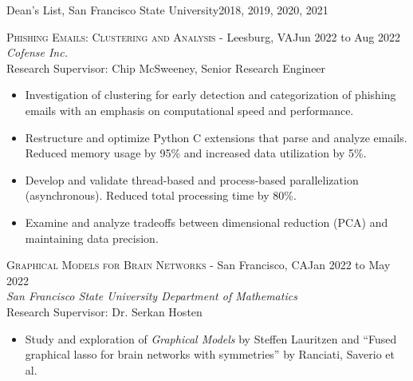 \documentclass[hidelinks, 10pt]{article}
\begin{document}
{{\begin{minipage}[ct]{0.9\linewidth}
Dean's List, San Francisco State University\hfill 2018, 2019, 2020, 2021
\end{minipage}
    
\vspace{6mm}

\hrulefill

\vspace{5mm}

\begin{minipage}[ct]{0.9\linewidth}
{\textsc{Phishing Emails: Clustering and Analysis} - Leesburg, VA}\hfill Jun 2022 to Aug 2022\\
\emph{Cofense Inc.}\\
Research Supervisor: Chip McSweeney, Senior Research Engineer
	\makeatletter
	\let\orig@listi\@listi
	\def\@listi{\orig@listi\topsep=0.25\baselineskip}
	\makeatother
    \begin{itemize}
    	\setlength\itemsep{-0.25em}
    	\item Investigation of clustering for early detection and
    	categorization of phishing emails with an emphasis on computational speed and
    	performance.
		\item Restructure and optimize Python C extensions that parse and
		analyze emails.  Reduced memory usage by 95\% and increased data
		utilization by 5\%.
		\item Develop and validate thread-based and process-based
		parallelization (asynchronous).  Reduced total processing time by 80\%.
		\item Examine and analyze tradeoffs between dimensional reduction (PCA) and
		maintaining data precision.
    \end{itemize}
\end{minipage}

\vspace{4mm}

\begin{minipage}[ct]{0.9\linewidth}
{\textsc{Graphical Models for Brain Networks} - San Francisco, CA}\hfill Jan 2022 to May 2022\\
\emph{San Francisco State University Department of Mathematics}\\
Research Supervisor: Dr. Serkan Hosten
	\makeatletter
	\let\orig@listi\@listi
	\def\@listi{\orig@listi\topsep=0.25\baselineskip}
	\makeatother
    \begin{itemize}
    	\setlength\itemsep{-0.25em}
    	\item Study and exploration of \emph{Graphical Models} by Steffen
    	Lauritzen and ``Fused graphical lasso for brain networks with
    	symmetries'' by Ranciati, Saverio et al.
    \end{itemize}
\end{minipage}

}}
\end{document}
